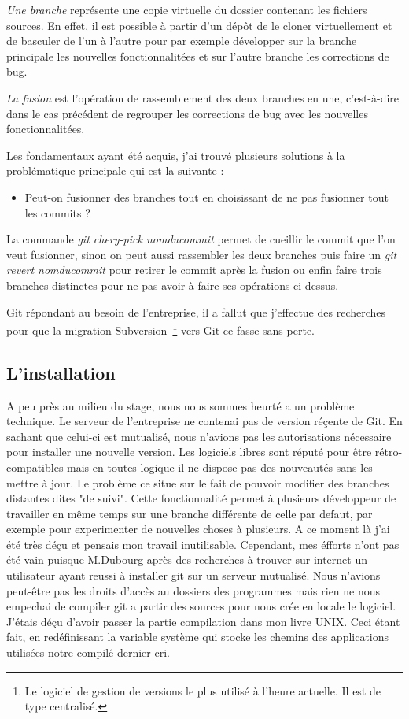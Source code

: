\emph{Une branche} représente une \og copie virtuelle \fg{} du dossier contenant
les fichiers sources. En effet, il est possible à partir d'un dépôt de le
cloner virtuellement et de basculer de l'un à l'autre pour par exemple
développer sur la branche principale les nouvelles fonctionnalitées et sur
l'autre branche les corrections de bug.

\emph{La fusion} est l'opération de rassemblement des deux branches en une,
c'est-à-dire dans le cas précédent de regrouper les corrections de bug avec les
nouvelles fonctionnalitées.

Les fondamentaux ayant été acquis, j'ai trouvé plusieurs solutions à la
problématique principale qui est la suivante :
\begin{itemize}
    \item Peut-on fusionner des branches tout en choisissant de ne pas
fusionner tout les commits ?
\end{itemize}

La commande \emph{git chery-pick \og nomducommit \fg{}} permet de \og cueillir
\fg{} le commit que l'on veut fusionner, sinon on peut aussi rassembler les deux
branches puis faire un \emph{git revert \og nomducommit \fg{}} pour retirer le
commit après la fusion ou enfin faire trois branches distinctes pour ne pas
avoir à faire ses opérations ci-dessus.

Git répondant au besoin de l'entreprise, il a fallut que j'effectue des
recherches pour que la migration Subversion\, \footnote{Le logiciel de gestion
de versions le plus utilisé à l’heure actuelle. Il est de type centralisé.}
vers Git ce fasse sans perte.

\subsection{L'installation} %
\label{sec:L'installation}

A peu près au milieu du stage, nous nous sommes heurté a un problème technique.
Le serveur de l'entreprise ne contenai pas de version réçente de Git.  En
sachant que celui-ci est mutualisé, nous n'avions pas les autorisations
nécessaire pour installer une nouvelle version. Les logiciels libres sont
réputé pour être rétro-compatibles mais en toutes logique il ne dispose pas des
nouveautés sans les mettre à jour. Le problème ce situe sur le fait de pouvoir
modifier des branches distantes dites "de suivi". Cette fonctionnalité permet à
plusieurs développeur de travailler en même temps sur une branche différente de
celle par defaut, par exemple pour experimenter de nouvelles choses à
plusieurs. A ce moment là j'ai été très déçu et pensais mon travail
inutilisable. Cependant, mes éfforts n'ont pas été vain puisque M.Dubourg après
des recherches à trouver sur internet un utilisateur ayant reussi à installer
git sur un serveur mutualisé. Nous n'avions peut-être pas les droits d'accès au
dossiers des programmes mais rien ne nous empechai de compiler git a partir des
sources pour nous crée en locale le logiciel. J'étais déçu d'avoir passer la
partie compilation dans mon livre UNIX. Ceci étant fait, en redéfinissant la
variable système qui stocke les chemins des applications utilisées notre
compilé dernier cri.


